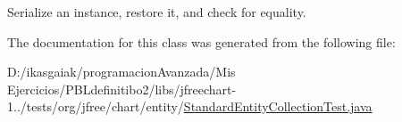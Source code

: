 Serialize an instance, restore it, and check for equality. 

The documentation for this class was generated from the following file\+:\begin{DoxyCompactItemize}
\item 
D\+:/ikasgaiak/programacion\+Avanzada/\+Mis Ejercicios/\+P\+B\+Ldefinitibo2/libs/jfreechart-\/1../tests/org/jfree/chart/entity/\mbox{\hyperlink{_standard_entity_collection_test_8java}{Standard\+Entity\+Collection\+Test.\+java}}\end{DoxyCompactItemize}
